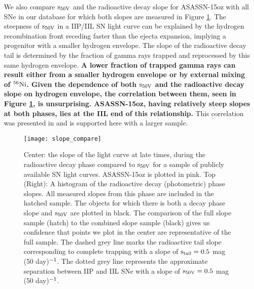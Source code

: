 \documentclass[a4paper,fleqn,usenatbib]{mnras}
\begin{document}
We also compare $\rm{s_{50V}}$ and the radioactive decay slope  for ASASSN-15oz with all SNe in our database for which both slopes are measured in Figure \ref{fig:SlopeComp}.
The steepness of $\rm{s_{50V}}$ in a IIP/IIL SN light curve can be explained by the hydrogen recombination front receding faster than the ejecta expansion, implying a progenitor with a smaller hydrogen envelope.
The slope of the radioactive decay tail is determined by the fraction of gamma rays trapped and reprocessed by this same hydrogen envelope.
\textbf{A lower fraction of trapped gamma rays can result either from a smaller hydrogen envelope or by external mixing of $\rm{^{56}Ni}$.
Given the dependence of both  $\rm{s_{50V}}$  and the radioactive decay slope on hydrogen envelope, the correlation between them, seen in Figure \ref{fig:SlopeComp}, is unsurprising. 
ASASSN-15oz, having relatively steep slopes at both phases, lies at the IIL end of this relationship.}
This correlation was presented in \citet{2014anderson} and is supported here with a larger sample.
\begin{figure}
\begin{center}
\texttt{[image: slope\_compare]} %
\caption{Center: the slope of the light curve at late times, during the radioactive decay phase compared to $\rm{s_{50V}}$ for a sample of publicly available SN light curves.
ASASSN-15oz is plotted in pink.
Top (Right): A histogram of the radioactive decay (photometric) phase slopes. All measured slopes from this phase are included in the hatched sample.
The objects for which there is both a decay phase slope and $\rm{s_{50V}}$  are plotted in black. The comparison of the full slope sample (hatch) to the combined slope sample (black) gives us confidence that points we plot in the center are representative of the full sample. 
The dashed grey line marks the radioactive tail slope corresponding to complete trapping with a slope of $\rm{s_{tail} = 0.5}$ mag (50 day)$\rm{^{-1}}$.
The dotted grey line represents the approximate separation between IIP and IIL SNe with a slope of $\rm{s_{50V}=0.5}$ mag (50 day)$\rm{^{-1}}$. 
 }
\label{fig:SlopeComp}
\end{center}
\end{figure}
\end{document}
